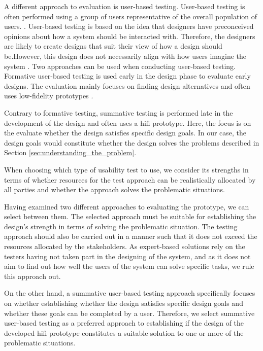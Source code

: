 A different approach to evaluation is user-based testing.
User-based testing is often performed using a group of users representative of the overall population of users. \cite{researchmethodsinhumancomputerinteraction}.
User-based testing is based on the idea that designers have preconceived opinions about how a system should be interacted with. 
Therefore, the designers are likely to create designs that suit their view of how a design should be.However, this design does not necessarily align with how users imagine the system \cite{user-centred-design,researchmethodsinhumancomputerinteraction}.
Two approaches can be used when conducting user-based testing. 
Formative user-based testing is used early in the design phase to evaluate early designs. 
The evaluation mainly focuses on finding design alternatives and often uses low-fidelity prototypes \cite{dumasAndFox_formative_usability_testing}.

Contrary to formative testing, summative testing is performed late in the development of the design and often uses a hifi prototype.
Here, the focus is on the evaluate whether the design satisfies specific design goals. \cite{dumasAndFox_formative_usability_testing}
In our case, the design goals would constitute whether the design solves the problems described in Section \ref{sec:understanding_the_problem}.

When choosing which type of usability test to use, we consider its strengths in terms of whether resources for the test approach can be realistically allocated by all parties and whether the approach solves the problematic situations.

Having examined two different approaches to evaluating the prototype, we can select between them.
The selected approach must be suitable for establishing the design's strength in terms of solving the problematic situation. 
The testing approach should also be carried out in a manner such that it does not exceed the resources allocated by the stakeholders. 
As expert-based solutions rely on the testers having not taken part in the designing of the system, and as it does not aim to find out how well the users of the system can solve specific tasks, we rule this approach out.

On the other hand, a summative user-based testing approach specifically focuses on whether establishing whether the design satisfies specific design goals and whether these goals can be completed by a user. 
Therefore, we select summative user-based testing as a preferred approach to establishing if the design of the developed hifi prototype constitutes a suitable solution to one or more of the problematic situations. 

